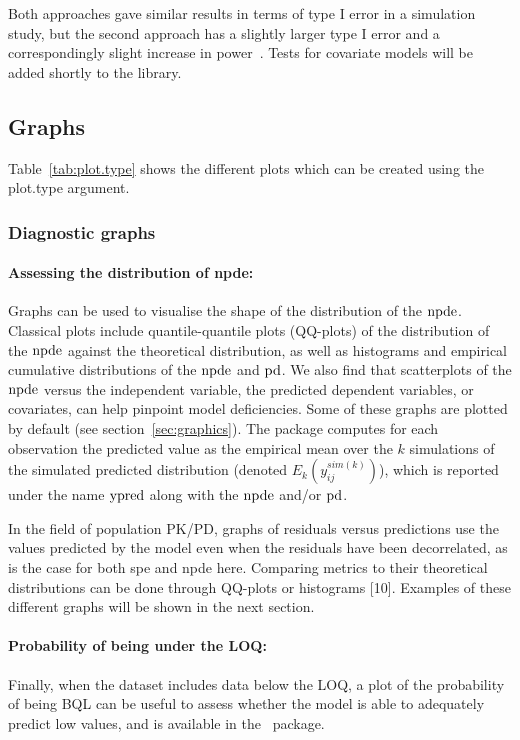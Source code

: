 Both approaches gave similar results in terms of type I error in a simulation study, but the second approach has a 
slightly larger type I error and a correspondingly slight increase in power~\cite{Brendel10}. Tests for covariate 
models will be added shortly to the library.

\subsection{Graphs} \label{sec:graphmethods}

Table~\ref{tab:plot.type} shows the different plots which can be created using the {\sf plot.type} argument.

\subsubsection{Diagnostic graphs} 

\paragraph{Assessing the distribution of npde:} Graphs can be used to visualise the shape of the distribution of 
the ${\rm npde}$. Classical plots include quantile-quantile plots (QQ-plots) of the distribution of the ${\rm npde}$ against 
the theoretical distribution, as well as  histograms and empirical cumulative distributions of the ${\rm npde}$ and 
${\rm pd}$. We also find that scatterplots of the ${\rm npde}$ versus the independent variable, the predicted dependent 
variables, or covariates, can help pinpoint model deficiencies. Some of these graphs are plotted by default (see 
section~\ref{sec:graphics}). The package computes for each observation the predicted value as the empirical mean 
over the $k$ simulations of the simulated predicted distribution (denoted $E_k(y^{sim(k)}_{ij})$), which is 
reported under the name ${\rm ypred}$ along with the ${\rm npde}$ and/or ${\rm pd}$.

In the field of population PK/PD, graphs of residuals versus predictions use the values predicted by the model even 
when the residuals have been decorrelated, as is the case for both spe and npde here. Comparing metrics to their 
theoretical distributions can be done through QQ-plots or histograms [10]. Examples of these different graphs will 
be shown in the next section.

\paragraph{Probability of being under the LOQ:} Finally, when the dataset includes data below the LOQ, a plot of 
the probability of being BQL can be useful to assess whether the model is able to adequately predict low values, 
and is available in the \npde~package.


